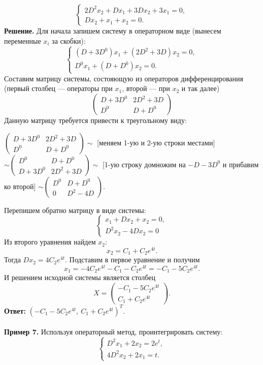 \documentclass[a4paper, 12pt]{article}
\begin{document}
$$\begin{cases}
	2D^2x_2 + Dx_1 + 3Dx_2 + 3x_1 =0,\\
	Dx_2 + x_1 + x_2 = 0.
\end{cases}$$
\textbf{Решение.} Для начала запишем систему в операторном виде (вынесем переменные $x_i$ за скобки): 
$$\begin{cases}
	(D + 3D^0)x_1 + (2D^2 + 3D)x_2 =0,\\
	 D^0x_1 + (D + D^0)x_2= 0.
\end{cases}$$
Составим матрицу системы, состояющую из операторов дифференцирования (первый столбец --- операторы при $x_1$, второй --- при $x_2$ и так далее)
$$\begin{pmatrix}
	D + 3D^0 & 2D^2 + 3D\\
	D^0 & D + D^0
\end{pmatrix}$$
Данную матрицу требуется привести к треугольному виду:
\begin{center}
	$\begin{pmatrix}
		D + 3D^0 & 2D^2 + 3D\\
		D^0 & D + D^0
	\end{pmatrix}\sim$ [меняем 1-ую и 2-ую строки местами] $\sim \begin{pmatrix}
	D^0 & D + D^0\\
	D + 3D^0 & 2D^2 + 3D
\end{pmatrix}\sim$ [1-ую строку домножим на $-D-3D^0$ и прибавим ко второй] $\sim \begin{pmatrix}
D^0 & D + D^0\\
0 & D^2 - 4D
\end{pmatrix}.$
\end{center}
Перепишем обратно матрицу в виде системы:
$$\begin{cases}
	x_1 + Dx_2 + x_2 = 0,\\
	D^2x_2 - 4Dx_2 = 0
\end{cases}$$
Из второго уравнения найдем $x_2$: $$x_2 = C_1 + C_2e^{4t}.$$ Тогда $Dx_2 = 4C_2e^{4t}$. Подставим в первое уравнение и получим $$x_1 = -4C_2e^{4t} - C_1 - C_2e^{4t}= -C_1 - 5C_2e^{4t}.$$
И решением исходной системы является столбец 
$$X = \begin{pmatrix}
	-C_1 - 5C_2e^{4t}\\
	C_1 + C_2e^{4t}
\end{pmatrix}.$$
\textbf{Ответ:} $(-C_1 - 5C_2e^{4t},\
C_1 + C_2e^{4t})^T$.\\\\
\textbf{Пример 7.} Используя операторный метод, проинтегрировать систему:
$$\begin{cases}
	D^2x_1 + 2x_2 = 2e^t,\\
	4D^2x_2 + 2x_1 = t.
\end{cases}$$
\end{document}

